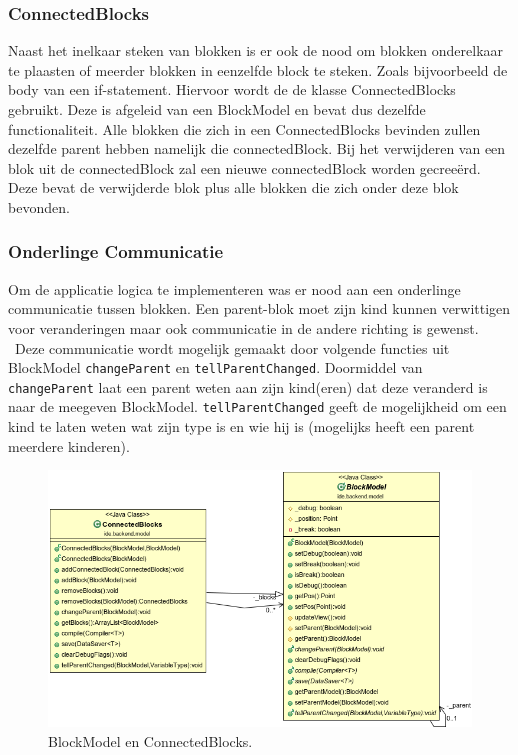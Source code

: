 \documentclass[]{article}
\begin{document}
\subsubsection{ConnectedBlocks}
\label{connectedBlocks}
Naast het inelkaar steken van blokken is er ook de nood om blokken onderelkaar te plaasten of meerder blokken in eenzelfde block te steken. Zoals bijvoorbeeld de body van een if-statement. Hiervoor wordt de de klasse ConnectedBlocks gebruikt. Deze is afgeleid van een BlockModel en bevat dus dezelfde functionaliteit. Alle blokken die zich in een ConnectedBlocks bevinden zullen dezelfde parent hebben namelijk die connectedBlock. Bij het verwijderen van een blok uit de connectedBlock zal een nieuwe connectedBlock worden gecree\"{e}rd. Deze bevat de verwijderde blok plus alle blokken die zich onder deze blok bevonden. 
\subsubsection{Onderlinge Communicatie}
\label{onderlingeCommunicatie}
Om de applicatie logica te implementeren was er nood aan een onderlinge communicatie tussen blokken. Een parent-blok moet zijn kind kunnen verwittigen voor veranderingen maar ook communicatie in de andere richting is gewenst.\\\
Deze communicatie wordt mogelijk gemaakt door volgende functies uit BlockModel \texttt{changeParent} en \texttt{tellParentChanged}. Doormiddel van \texttt{changeParent} laat een parent weten aan zijn kind(eren) dat deze veranderd is naar de meegeven BlockModel. \texttt{tellParentChanged} geeft de mogelijkheid om een kind te laten weten wat zijn type is en wie hij is (mogelijks heeft een parent meerdere kinderen).
\begin{figure}[H]
  \centering
\includegraphics[scale=0.4]{AnalyseADTAlgorithm/blockmodel/baseclassuml}
  \caption{BlockModel en ConnectedBlocks.} \label{BlockModelUML}
\end{figure}
\end{document}
